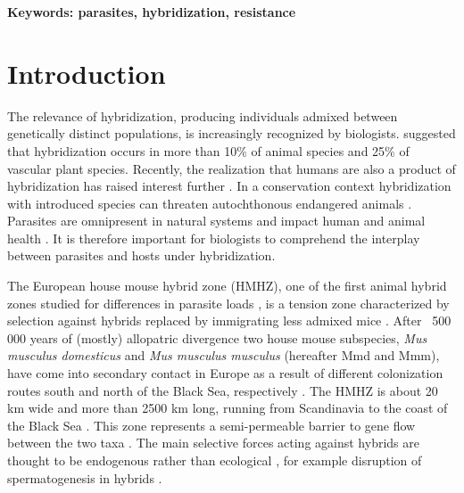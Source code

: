 \textbf{Keywords: parasites, hybridization, resistance}

\section{Introduction}
The relevance of hybridization, producing individuals admixed between genetically distinct populations, is increasingly recognized by biologists. \cite{mallet_hybridization_2005} suggested that hybridization occurs in more than 10\% of animal species and 25\% of vascular plant species. Recently, the realization that humans are also a product of hybridization has raised interest further \citep{green_draft_2010}. In a conservation context hybridization with introduced species can threaten autochthonous endangered animals \citep{simberloff_hybridization_1996}. Parasites are omnipresent in natural systems and impact human and animal health \citep{schurer_community-based_2016}. It is therefore important for biologists to comprehend the interplay between parasites and hosts under hybridization.
\par The European house mouse hybrid zone (HMHZ), one of the first animal hybrid zones studied for differences in parasite loads \citep{sage_wormy_1986}, is a tension zone characterized by selection against hybrids replaced by immigrating less admixed mice \citep{barton_analysis_1985}. After ~500 000 years of (mostly) allopatric divergence two house mouse subspecies, \textit{Mus musculus domesticus} and \textit{Mus musculus musculus} (hereafter Mmd and Mmm), have come into secondary contact in Europe as a result of different colonization routes south and north of the Black Sea, respectively \citep{boursot_evolution_1993, duvaux_isolation_2011}. The HMHZ is about 20 km wide and more than 2500 km long, running from Scandinavia to the coast of the Black Sea \citep{baird_what_2012, boursot_evolution_1993, jones_norwegian_2010, macholan_location_2003}. This zone represents a semi-permeable barrier to gene flow between the two taxa \citep{macholan_genetic_2007, macholan_assessing_2011}. The main selective forces acting against hybrids are thought to be endogenous rather than ecological \citep{baird_what_2012, boursot_evolution_1993}, for example disruption of spermatogenesis in hybrids \citep{albrechtova_sperm-related_2012, turner_reduced_2012}.
